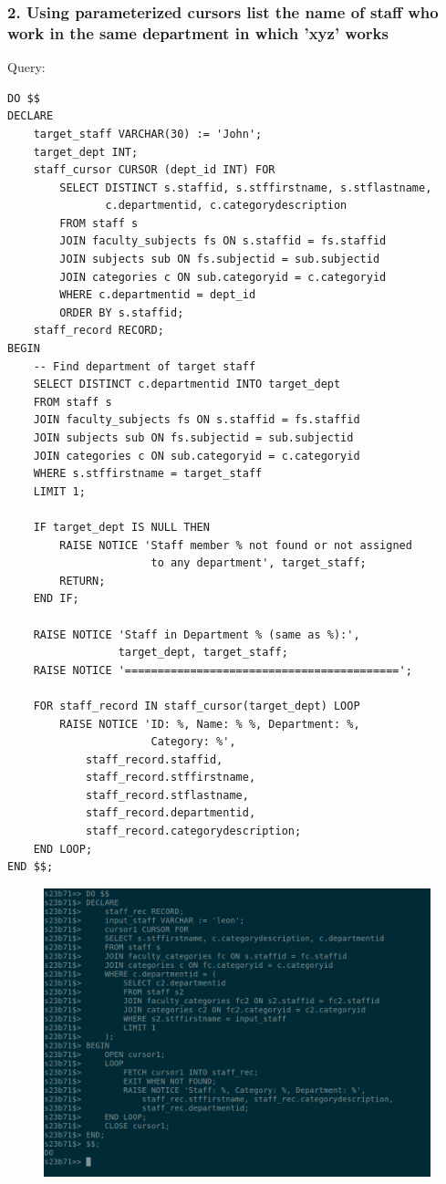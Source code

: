 \documentclass{article}
\begin{document}
\newpage
\subsubsection*{2. Using parameterized cursors list the name of staff who work in the same department in which 'xyz' works}
Query:
\begin{Verbatim}[frame=single,framerule=1pt,fontfamily=courier,fontsize=\small]
DO $$
DECLARE
    target_staff VARCHAR(30) := 'John';
    target_dept INT;
    staff_cursor CURSOR (dept_id INT) FOR
        SELECT DISTINCT s.staffid, s.stffirstname, s.stflastname, 
               c.departmentid, c.categorydescription
        FROM staff s
        JOIN faculty_subjects fs ON s.staffid = fs.staffid
        JOIN subjects sub ON fs.subjectid = sub.subjectid
        JOIN categories c ON sub.categoryid = c.categoryid
        WHERE c.departmentid = dept_id
        ORDER BY s.staffid;
    staff_record RECORD;
BEGIN
    -- Find department of target staff
    SELECT DISTINCT c.departmentid INTO target_dept
    FROM staff s
    JOIN faculty_subjects fs ON s.staffid = fs.staffid
    JOIN subjects sub ON fs.subjectid = sub.subjectid
    JOIN categories c ON sub.categoryid = c.categoryid
    WHERE s.stffirstname = target_staff
    LIMIT 1;
    
    IF target_dept IS NULL THEN
        RAISE NOTICE 'Staff member % not found or not assigned 
                      to any department', target_staff;
        RETURN;
    END IF;
    
    RAISE NOTICE 'Staff in Department % (same as %):',
                 target_dept, target_staff;
    RAISE NOTICE '==========================================';
    
    FOR staff_record IN staff_cursor(target_dept) LOOP
        RAISE NOTICE 'ID: %, Name: % %, Department: %, 
                      Category: %',
            staff_record.staffid,
            staff_record.stffirstname,
            staff_record.stflastname,
            staff_record.departmentid,
            staff_record.categorydescription;
    END LOOP;
END $$;
\end{Verbatim}
\begin{figure}[H]
    \centering
    \includegraphics[width=\textwidth]{cycle6/6-5.png}
\end{figure}
\end{document}
